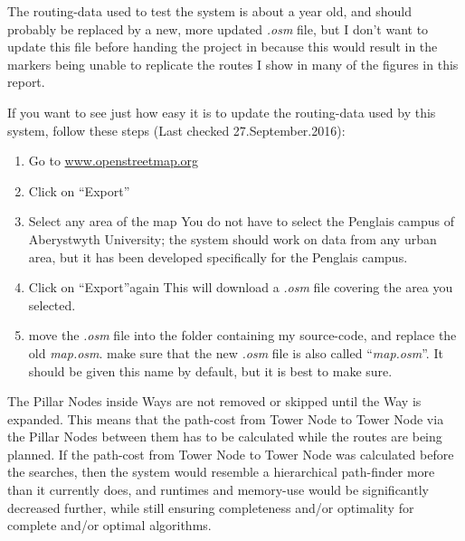 The routing-data used to test the system is about a year old, and should probably be replaced by a new, more updated \textit{.osm} file, but I don't want to update this file before handing the project in because this would result in the markers being unable to replicate the routes I show in many of the figures in this report.

If you want to see just how easy it is to update the routing-data used by this system, follow these steps (Last checked 27.September.2016):
\begin{enumerate}
	\item Go to \url{www.openstreetmap.org}
	\item Click on \textquotedblleft Export\textquotedblright
	\item Select any area of the map
	\subitem You do not have to select the Penglais campus of Aberystwyth University; the system should work on data from any urban area, but it has been developed specifically for the Penglais campus.
	\item Click on \textquotedblleft Export\textquotedblright again
	\subitem This will download a \textit{.osm} file covering the area you selected.
	\item move the \textit{.osm} file into the folder containing my source-code, and replace the old \textit{map.osm}.
	\subitem make sure that the new \textit{.osm} file is also called \textquotedblleft \textit{map.osm}\textquotedblright.
	\subsubitem It should be given this name by default, but it is best to make sure.
\end{enumerate}


The Pillar Nodes inside Ways are not removed or skipped until the Way is expanded. This means that the path-cost from Tower Node to Tower Node via the Pillar Nodes between them has to be calculated while the routes are being planned. If the path-cost from Tower Node to Tower Node was calculated before the searches, then the system would resemble a hierarchical path-finder more than it currently does, and runtimes and memory-use would be significantly decreased further, while still ensuring completeness and/or optimality for complete and/or optimal algorithms.


